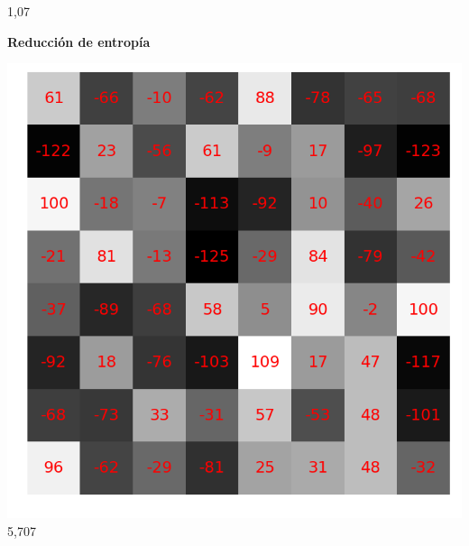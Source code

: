 \documentclass{beamer}
\begin{document}
\begin{frame}
\begin{minipage}[t]{0.42\linewidth}
\begin{center}
            1,07
        \end{center}
    \end{minipage}
\end{frame}

\begin{frame}
    \textbf{Reducción de entropía}
    
    \begin{minipage}[t]{0.42\linewidth}
        \begin{center}
            \includegraphics[scale=0.2]{fig/8x8random_entropy2.png}\\
            5,707
        \end{center}
    \end{minipage}
    \hfill
    \begin{minipage}[t]{0.42\linewidth}
        \begin{center}

\end{center}
\end{minipage}
\end{frame}
\end{document}
